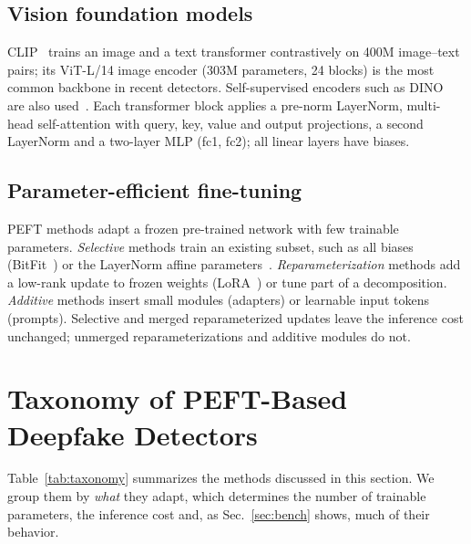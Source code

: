\documentclass[fonts]{icst}
\begin{document}
\subsection{Vision foundation models}
CLIP~\cite{radford2021clip_vitl} trains an image and a text transformer contrastively on 400M image--text pairs; its ViT-L/14 image encoder (303M parameters, 24 blocks) is the most common backbone in recent detectors. Self-supervised encoders such as DINO~\cite{caron2021emerging} are also used~\cite{zhang2026dino,zou2026clipdino}. Each transformer block applies a pre-norm LayerNorm, multi-head self-attention with query, key, value and output projections, a second LayerNorm and a two-layer MLP (fc1, fc2); all linear layers have biases.

\subsection{Parameter-efficient fine-tuning}
PEFT methods adapt a frozen pre-trained network with few trainable parameters. \emph{Selective} methods train an existing subset, such as all biases (BitFit~\cite{benzaken2022bitfit}) or the LayerNorm affine parameters~\cite{wang2022ln,giannou2023layernorm,valizadeh2024layernorm}. \emph{Reparameterization} methods add a low-rank update to frozen weights (LoRA~\cite{hu2022lora}) or tune part of a decomposition. \emph{Additive} methods insert small modules (adapters) or learnable input tokens (prompts). Selective and merged reparameterized updates leave the inference cost unchanged; unmerged reparameterizations and additive modules do not.

\section{Taxonomy of PEFT-Based Deepfake Detectors}
\label{sec:taxonomy}

Table~\ref{tab:taxonomy} summarizes the methods discussed in this section. We group them by \emph{what} they adapt, which determines the number of trainable parameters, the inference cost and, as Sec.~\ref{sec:bench} shows, much of their behavior.
\end{document}
